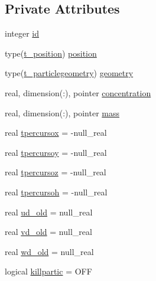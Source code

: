 \subsection*{Private Attributes}
\begin{DoxyCompactItemize}
\item 
integer \mbox{\hyperlink{structmodulelagrangian_1_1t__partic_ab3683a7b65c1e63486d696bd5402d844}{id}}
\item 
type(\mbox{\hyperlink{structmodulelagrangian_1_1t__position}{t\+\_\+position}}) \mbox{\hyperlink{structmodulelagrangian_1_1t__partic_a681563d7b2fe6c9404ff36fed046ac06}{position}}
\item 
type(\mbox{\hyperlink{structmodulelagrangian_1_1t__particlegeometry}{t\+\_\+particlegeometry}}) \mbox{\hyperlink{structmodulelagrangian_1_1t__partic_a00c14db996a66734a0e06c71f8be4c20}{geometry}}
\item 
real, dimension(\+:), pointer \mbox{\hyperlink{structmodulelagrangian_1_1t__partic_aa9db98a75148b49f4685b9973de8db32}{concentration}}
\item 
real, dimension(\+:), pointer \mbox{\hyperlink{structmodulelagrangian_1_1t__partic_a4a971317c29dd744d9446bb2938f39b4}{mass}}
\item 
real \mbox{\hyperlink{structmodulelagrangian_1_1t__partic_ad1b88b983827455a82948f8f89c7fd38}{tpercursox}} = -\/null\+\_\+real
\item 
real \mbox{\hyperlink{structmodulelagrangian_1_1t__partic_a13cdd2fba957649457015b06cd714d99}{tpercursoy}} = -\/null\+\_\+real
\item 
real \mbox{\hyperlink{structmodulelagrangian_1_1t__partic_a4c9a264702eea6e0af1ba2781518c213}{tpercursoz}} = -\/null\+\_\+real
\item 
real \mbox{\hyperlink{structmodulelagrangian_1_1t__partic_aca03208053c43ead906ae2cff990c29e}{tpercursoh}} = -\/null\+\_\+real
\item 
real \mbox{\hyperlink{structmodulelagrangian_1_1t__partic_a5274d0660ea41a834e5ea4642d104d07}{ud\+\_\+old}} = null\+\_\+real
\item 
real \mbox{\hyperlink{structmodulelagrangian_1_1t__partic_a9ddac8d98ae063566ff35e2d40539fa2}{vd\+\_\+old}} = null\+\_\+real
\item 
real \mbox{\hyperlink{structmodulelagrangian_1_1t__partic_a03e8d2c88e95d98f1a7815de9ec1a354}{wd\+\_\+old}} = null\+\_\+real
\item 
logical \mbox{\hyperlink{structmodulelagrangian_1_1t__partic_a644d23d3663cdf048e25c0497bb906cf}{killpartic}} = O\+FF
\item 

\end{DoxyCompactItemize}
